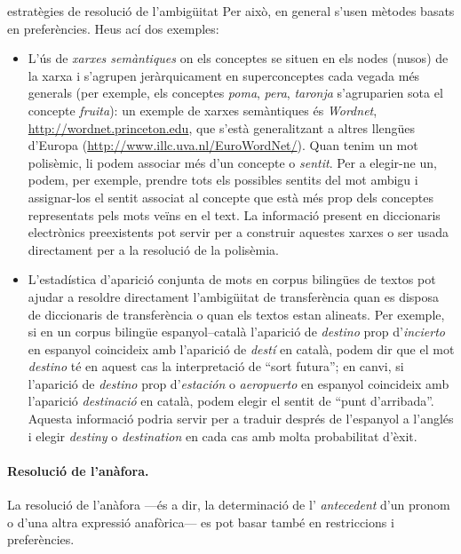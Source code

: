 \begin{persabermes}{estratègies de resolució de l'ambigüitat}
Per això, en general s'usen mètodes basats en preferències. Heus ací
dos exemples:
\begin{itemize}
\item L'ús de \emph{xarxes semàntiques} on els conceptes se situen en
  els nodes (nusos) de la xarxa i s'agrupen jeràrquicament en
  superconceptes cada vegada més generals (per exemple, els conceptes
  \emph{poma}, \emph{pera}, \emph{taronja} s'agruparien sota el
  concepte \emph{fruita}): un exemple de xarxes semàntiques és
    \emph{Wordnet}, \url{http://wordnet.princeton.edu}, que s'està
    generalitzant a altres llengües d'Europa
    (\url{http://www.illc.uva.nl/EuroWordNet/}).  Quan tenim un mot
  polisèmic, li podem associar més d'un concepte o \emph{sentit}. Per
  a elegir-ne un, podem, per exemple, prendre tots els possibles
  sentits del mot ambigu i assignar-los el sentit associat al concepte
  que està més prop dels conceptes representats pels mots veïns en el
  text.  La informació present en diccionaris electrònics preexistents
  pot servir per a construir aquestes xarxes o ser usada directament
  per a la resolució de la polisèmia.
\item L'estadística d'aparició conjunta de mots en corpus bilingües de
  textos pot ajudar a resoldre directament l'ambigüitat de
  transferència quan es disposa de diccionaris de transferència o quan
  els textos estan alineats. Per exemple, si en un corpus bilingüe
  espanyol--català l'aparició de \emph{destino} prop d'\emph{incierto}
  en espanyol coincideix amb l'aparició de \emph{destí} en català,
  podem dir que el mot \emph{destino} té en aquest cas la
  interpretació de ``sort futura''; en canvi, si l'aparició de {\em
    destino} prop d'\emph{estación} o \emph{aeropuerto} en espanyol
  coincideix amb l'aparició \emph{destinació} en català, podem elegir
  el sentit de ``punt d'arribada''. Aquesta informació podria servir
  per a traduir després de l'espanyol a l'anglés i elegir {\em
    destiny} o \emph{destination} en cada cas amb molta probabilitat
  d'èxit. %
  \end{itemize}

  \paragraph{Resolució de l'anàfora.}
  La resolució de l'anàfora ---és a dir, la determinació de l'{\em
    antecedent} d'un pronom o d'una altra expressió anafòrica--- es
  pot basar també en restriccions i preferències.


\end{persabermes}
